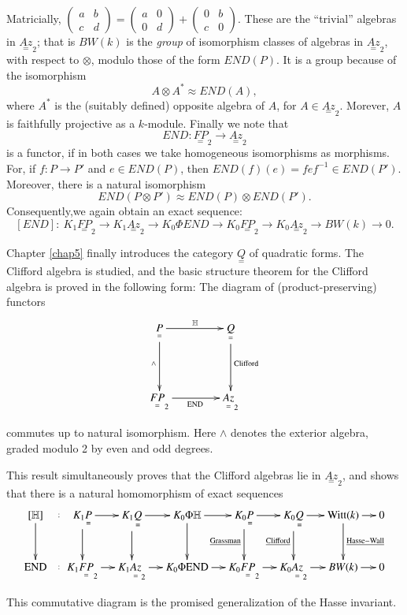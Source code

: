 Matricially, $\left(\begin{smallmatrix} a & b \\ c &
  d \end{smallmatrix}\right) = \left(\begin{smallmatrix} a & 0 \\ 0 &
  d \end{smallmatrix}\right) + \left(\begin{smallmatrix} 0 & b \\ c &
  0 \end{smallmatrix}\right)$. These are the ``trivial'' algebras in
$\underset{ =}{Az}_2$; that is $BW(k)$ is the \textit{group} of
isomorphism classes of algebras in $\underset{ =}{Az}_2$, with respect
to $\otimes$, modulo those of the form $END(P)$. It is a group because
of the isomorphism 
$$
A \otimes A^* \approx END (A), 
$$
where $A^*$ is the (suitably defined) opposite algebra of $A$, for $A
\in \underset{ =}{Az}_2$. Morever, $A$ is faithfully projective as a
$k$-module. Finally we note that 
$$
END : \underset{=}{FP}_2 \to \underset{=}{Az}_2 
$$
is a functor, if in both cases we take homogeneous isomorphisms as
morphisms. For, if $f: P \to P'$ and $e \in END(P)$, then $END(f) (e)=
fef^{-1} \in END(P')$. Moreover, there is a natural isomorphism 
$$
END(P \otimes P') \approx END(P) \otimes END(P'). 
$$
Consequently,\pageoriginale we again obtain an exact sequence:
{\fontsize{10pt}{12pt}\selectfont
$$
[END] : ~ K_1 \underset{ =}{FP}_2 \to K_1 \underset{ =}{Az}_2 \to K_0
\Phi END \to K_0 \underset{ =}{FP}_2 \to K_0 \underset{ =}{Az}_2 \to
BW(k) \to 0. 
$$}\relax

Chapter \ref{chap5} finally introduces the category $\underset{ =}{Q}$ of
quadratic forms. The Clifford algebra is studied, and the basic
structure theorem for the Clifford algebra is proved in the following
form: The diagram of (product-preserving) functors 
\[
\xymatrix@R=1.5cm@C=1.5cm{
\underset{=}{P} \ar[r]^{\mathbb{H}} \ar[d]_{\wedge} & \underset{=}{Q}
\ar[d]^{\text{Clifford}}\\ 
\underset{=}{FP}_2 \ar[r]_{\rm END} & \underset{=}{Az}_2
}
\]

commutes up to natural isomorphism. Here $\wedge$ denotes the exterior
algebra, graded modulo 2 by even and odd degrees. 

This result simultaneously proves that the Clifford algebras lie in
$\underset{ =}{Az}_2$, and shows that there is a natural homomorphism
of exact sequences 
{\fontsize{9pt}{11pt}\selectfont
\[
\xymatrix@R=0.9cm@C=0.43cm{
[\mathbb{H}] \ar[d] \ar@{}[r]|{:} & K_1 \underset{=}{P}\ar[d] \ar[r] &
K_1 \underset{=}{Q} \ar[r] \ar[d] & K_0 \Phi \mathbb{H} \ar[d] \ar[r]
& K_0 \underset{=}{P}\ar[r] \ar[d]_{\rm{\underline{Grassman}}} & K_0 \underset{=}{Q}
\ar[r] \ar[d]_{\rm{\underline{Clifford}}} & {\rm Witt}(k)\ar[r]
\ar[d]^{\rm{\underline{Hasse-Wall}}} & 0 \\ 
{\rm END} \ar@{}[r]|{:} & K_1 \underset{=}{FP}_2 \ar[r] & K_1
\underset{=}{Az}_2 \ar[r] & K_0 \Phi {\rm END} \ar[r] & K_0
\underset{=}{FP}_2 \ar[r] & K_0 \underset{=}{Az}_2 \ar[r] & BW(k)
\ar[r] & 0
}
\]}\relax

This commutative diagram is the promised generalization of the Hasse
invariant. 
